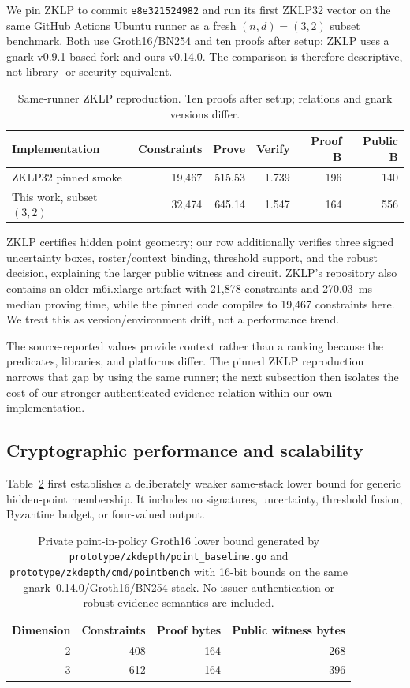 \documentclass[preprint,review,12pt]{elsarticle}
\begin{document}
We pin ZKLP to commit \texttt{e8e321524982} and run its first ZKLP32 vector on the same GitHub Actions Ubuntu runner as a fresh $(n,d)=(3,2)$ subset benchmark. Both use Groth16/BN254 and ten proofs after setup; ZKLP uses a gnark v0.9.1-based fork and ours v0.14.0. The comparison is therefore descriptive, not library- or security-equivalent.

\begin{table}[htbp]
\centering\scriptsize
\setlength{\tabcolsep}{3pt}
\caption{Same-runner ZKLP reproduction. Ten proofs after setup; relations and gnark versions differ.}
\label{tab:zklp-repro}
\begin{tabular}{lrrrrr}
\toprule
Implementation & Constraints & Prove & Verify & Proof B & Public B\\
\midrule
ZKLP32 pinned smoke & 19,467 & 515.53 & 1.739 & 196 & 140\\
This work, subset $(3,2)$ & 32,474 & 645.14 & 1.547 & 164 & 556\\
\bottomrule
\end{tabular}
\end{table}

ZKLP certifies hidden point geometry; our row additionally verifies three signed uncertainty boxes, roster/context binding, threshold support, and the robust decision, explaining the larger public witness and circuit. ZKLP's repository also contains an older m6i.xlarge artifact with 21,878 constraints and 270.03~ms median proving time, while the pinned code compiles to 19,467 constraints here. We treat this as version/environment drift, not a performance trend.

The source-reported values provide context rather than a ranking because the predicates, libraries, and platforms differ. The pinned ZKLP reproduction narrows that gap by using the same runner; the next subsection then isolates the cost of our stronger authenticated-evidence relation within our own implementation.

\subsection{Cryptographic performance and scalability}
Table~\ref{tab:point-zk} first establishes a deliberately weaker same-stack lower bound for generic hidden-point membership. It includes no signatures, uncertainty, threshold fusion, Byzantine budget, or four-valued output.

\begin{table}[htbp]
\centering\small
\caption{Private point-in-policy Groth16 lower bound generated by \texttt{prototype/zkdepth/point\_baseline.go} and \texttt{prototype/zkdepth/cmd/pointbench} with 16-bit bounds on the same gnark~0.14.0/Groth16/BN254 stack. No issuer authentication or robust evidence semantics are included.}
\label{tab:point-zk}
\begin{tabular}{rrrr}
\toprule Dimension & Constraints & Proof bytes & Public witness bytes\\
\midrule
2 & 408 & 164 & 268\\
3 & 612 & 164 & 396\\
\bottomrule
\end{tabular}
\end{table}
\end{document}
